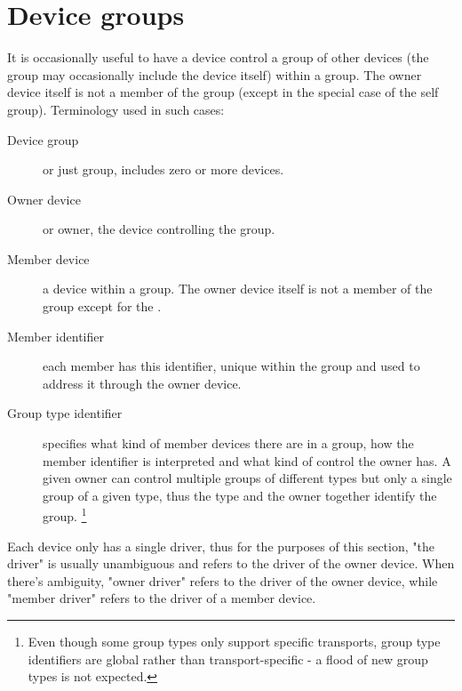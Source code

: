 \section{Device groups}\label{sec:Basic Facilities of a Virtio Device / Device groups}

It is occasionally useful to have a device control a group of
other devices (the group may occasionally include the device
itself) within a group. The owner device itself is not a
member of the group (except in the special case of the self group).
Terminology used in such cases:

\begin{description}
\item[Device group]
        or just group, includes zero or more devices.
\item[Owner device]
        or owner, the device controlling the group.
\item[Member device]
        a device within a group. The owner device itself is not
	a member of the group except for the .
\item[Member identifier]
        each member has this identifier, unique within the group
	and used to address it through the owner device.
\item[Group type identifier]
	specifies what kind of member devices there are in a
	group, how the member identifier is interpreted
	and what kind of control the owner has.
	A given owner can control multiple groups
	of different types but only a single group of a given type,
	thus the type and the owner together identify the group.
	\footnote{Even though some group types only support
			specific transports, group type identifiers
			are global rather than transport-specific -
			a flood of new group types is not expected.}
\end{description}

\begin{note}
Each device only has a single driver, thus for the purposes of
this section, "the driver" is usually unambiguous and refers to
the driver of the owner device.  When there's ambiguity, "owner
driver" refers to the driver of the owner device, while "member
driver" refers to the driver of a member device.
\end{note}


